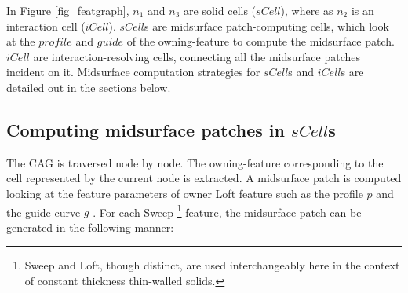 In Figure \ref{fig_featgraph},  $n_1$ and $n_3$ are solid cells ($sCell$), where as $n_2$ is an interaction cell ($iCell$).  $sCell$s are midsurface patch-computing cells, which look at the $profile$ and $guide$ of the owning-feature to compute the midsurface patch. $iCell$ are interaction-resolving cells, connecting all the midsurface patches incident on it. Midsurface computation strategies for $sCell$s and  $iCell$s are detailed out in the sections below.
			
\subsection{Computing midsurface patches in $sCell$s}
\label{sec:scell}
The CAG is traversed node by node. The owning-feature corresponding to the cell represented by the current node is extracted. A midsurface patch is computed looking at the feature parameters of owner Loft feature such as the profile $p$ and the guide curve $g$ \cite{YogeshIITG2014}. %
%
%
%
%
For each Sweep \footnote{ Sweep and Loft, though distinct, are used interchangeably here in the context of constant thickness thin-walled solids.} feature, the midsurface patch can be generated in the following manner: 

%
%

